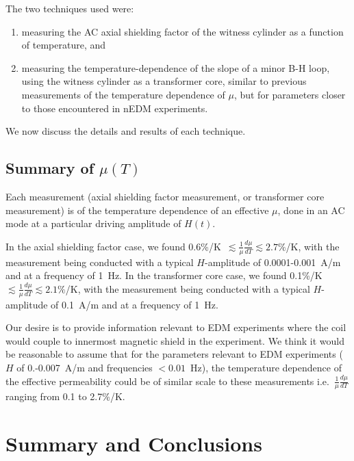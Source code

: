 \documentclass[review]{elsarticle}
\begin{document}
The two techniques used were:
\begin{enumerate}
\item measuring the AC axial shielding factor of the witness cylinder
  as a function of temperature, and
\item measuring the temperature-dependence of the slope of a minor B-H
  loop, using the witness cylinder as a transformer core, similar to
  previous measurements of the temperature dependence of $\mu$, but
  for parameters closer to those encountered in nEDM experiments.
\end{enumerate}
We now discuss the details and results of each technique.







\subsection{Summary of $\mu(T)$}

Each measurement (axial shielding factor measurement, or transformer
core measurement) is of the temperature dependence of an effective
$\mu$, done in an AC mode at a particular driving amplitude of $H(t)$.

In the axial shielding factor case, we found
0.6\%/K~$\lesssim\frac{1}{\mu}\frac{d\mu}{dT}\lesssim 2.7\%$/K, with
the measurement being conducted with a typical $H$-amplitude of 0.0001-0.001~A/m
and at a frequency of 1~Hz.  In the transformer core case, we found
0.1\%/K~$\lesssim\frac{1}{\mu}\frac{d\mu}{dT}\lesssim 2.1\%$/K, with
the measurement being conducted with a typical $H$-amplitude of
0.1~A/m and at a frequency of 1~Hz.

Our desire is to provide information relevant to EDM experiments where
the coil would couple to innermost magnetic shield in the experiment.
We think it would be reasonable to assume that for the parameters
relevant to EDM experiments ($H$ of 0.-0.007~A/m and frequencies
$<0.01$~Hz), the temperature dependence of the effective permeability
could be of similar scale to these measurements
i.e.~$\frac{1}{\mu}\frac{d\mu}{dT}$ ranging from 0.1 to 2.7\%/K.

\section{Summary and Conclusions}
\end{document}
